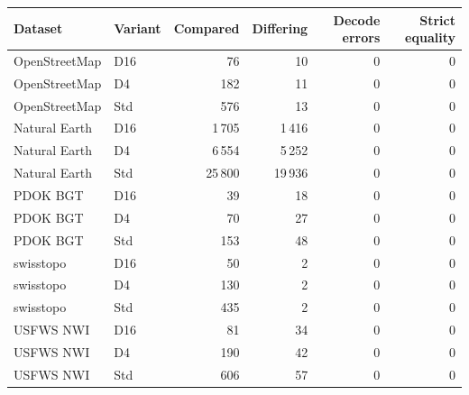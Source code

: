\begingroup\small\setlength{\tabcolsep}{3pt}
\begin{longtable}{llrrrr}
\toprule
Dataset & Variant & Compared & Differing & Decode errors & Strict equality \\
\midrule
OpenStreetMap & D16 & 76 & 10 & 0 & 0 \\
OpenStreetMap & D4 & 182 & 11 & 0 & 0 \\
OpenStreetMap & Std & 576 & 13 & 0 & 0 \\
Natural Earth & D16 & 1\,705 & 1\,416 & 0 & 0 \\
Natural Earth & D4 & 6\,554 & 5\,252 & 0 & 0 \\
Natural Earth & Std & 25\,800 & 19\,936 & 0 & 0 \\
PDOK BGT & D16 & 39 & 18 & 0 & 0 \\
PDOK BGT & D4 & 70 & 27 & 0 & 0 \\
PDOK BGT & Std & 153 & 48 & 0 & 0 \\
swisstopo & D16 & 50 & 2 & 0 & 0 \\
swisstopo & D4 & 130 & 2 & 0 & 0 \\
swisstopo & Std & 435 & 2 & 0 & 0 \\
USFWS NWI & D16 & 81 & 34 & 0 & 0 \\
USFWS NWI & D4 & 190 & 42 & 0 & 0 \\
USFWS NWI & Std & 606 & 57 & 0 & 0 \\
\bottomrule
\end{longtable}
\endgroup
